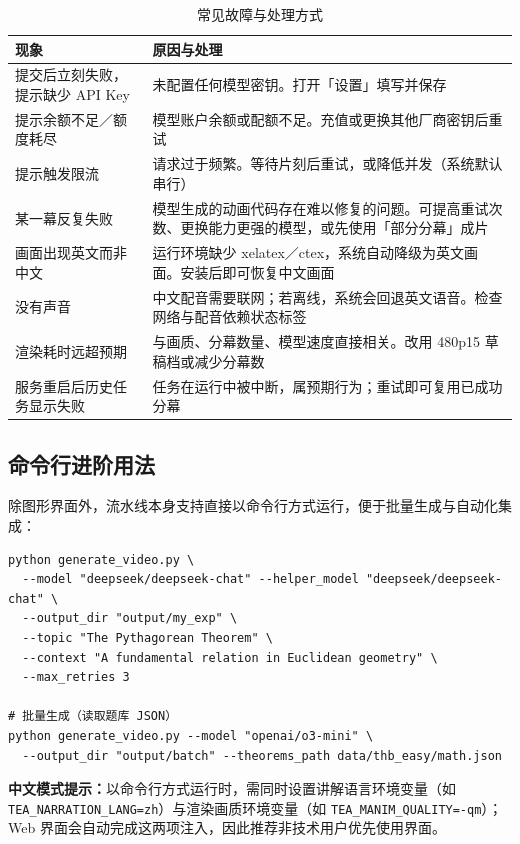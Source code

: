 \documentclass[11pt,a4paper]{ctexart}
\begin{document}
\begin{table}[htbp]
\centering
\small
\caption{常见故障与处理方式}
\begin{tabularx}{\textwidth}{@{}p{4.6cm} X@{}}
\toprule
\textbf{现象} & \textbf{原因与处理} \\
\midrule
提交后立刻失败，提示缺少 API Key & 未配置任何模型密钥。打开「设置」填写并保存 \\
提示余额不足／额度耗尽 & 模型账户余额或配额不足。充值或更换其他厂商密钥后重试 \\
提示触发限流 & 请求过于频繁。等待片刻后重试，或降低并发（系统默认串行） \\
某一幕反复失败 & 模型生成的动画代码存在难以修复的问题。可提高重试次数、更换能力更强的模型，或先使用「部分分幕」成片 \\
画面出现英文而非中文 & 运行环境缺少 xelatex／ctex，系统自动降级为英文画面。安装后即可恢复中文画面 \\
没有声音 & 中文配音需要联网；若离线，系统会回退英文语音。检查网络与配音依赖状态标签 \\
渲染耗时远超预期 & 与画质、分幕数量、模型速度直接相关。改用 480p15 草稿档或减少分幕数 \\
服务重启后历史任务显示失败 & 任务在运行中被中断，属预期行为；重试即可复用已成功分幕 \\
\bottomrule
\end{tabularx}
\end{table}

\subsection{命令行进阶用法}

除图形界面外，流水线本身支持直接以命令行方式运行，便于批量生成与自动化集成：

\begin{lstlisting}
python generate_video.py \
  --model "deepseek/deepseek-chat" --helper_model "deepseek/deepseek-chat" \
  --output_dir "output/my_exp" \
  --topic "The Pythagorean Theorem" \
  --context "A fundamental relation in Euclidean geometry" \
  --max_retries 3

# 批量生成（读取题库 JSON）
python generate_video.py --model "openai/o3-mini" \
  --output_dir "output/batch" --theorems_path data/thb_easy/math.json
\end{lstlisting}

\begin{notebox}
\textbf{中文模式提示：}以命令行方式运行时，需同时设置讲解语言环境变量（如 \texttt{TEA\_NARRATION\_LANG=zh}）与渲染画质环境变量（如 \texttt{TEA\_MANIM\_QUALITY=-qm}）；Web 界面会自动完成这两项注入，因此推荐非技术用户优先使用界面。
\end{notebox}
\end{document}
